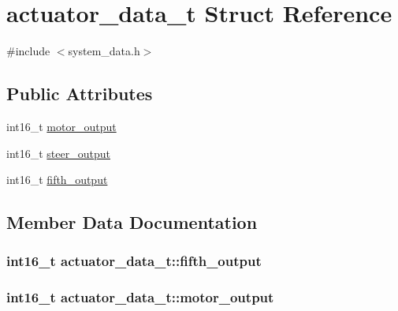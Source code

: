 \hypertarget{structactuator__data__t}{}\section{actuator\+\_\+data\+\_\+t Struct Reference}
\label{structactuator__data__t}


{\ttfamily \#include $<$system\+\_\+data.\+h$>$}

\subsection*{Public Attributes}
\begin{DoxyCompactItemize}
\item 
int16\+\_\+t \hyperlink{structactuator__data__t_a6bb0dbd1bc0cbf0938b3d3b97a180341}{motor\+\_\+output}
\item 
int16\+\_\+t \hyperlink{structactuator__data__t_acf5132436492fb9e558cf10d0b6b645c}{steer\+\_\+output}
\item 
int16\+\_\+t \hyperlink{structactuator__data__t_a596e1fa7fcb12226e6be45007a46a4a2}{fifth\+\_\+output}
\end{DoxyCompactItemize}


\subsection{Member Data Documentation}
\subsubsection[{\texorpdfstring{fifth\+\_\+output}{fifth_output}}]{\setlength{\rightskip}{0pt plus 5cm}int16\+\_\+t actuator\+\_\+data\+\_\+t\+::fifth\+\_\+output}\hypertarget{structactuator__data__t_a596e1fa7fcb12226e6be45007a46a4a2}{}\label{structactuator__data__t_a596e1fa7fcb12226e6be45007a46a4a2}
\subsubsection[{\texorpdfstring{motor\+\_\+output}{motor_output}}]{\setlength{\rightskip}{0pt plus 5cm}int16\+\_\+t actuator\+\_\+data\+\_\+t\+::motor\+\_\+output}\hypertarget{structactuator__data__t_a6bb0dbd1bc0cbf0938b3d3b97a180341}{}\label{structactuator__data__t_a6bb0dbd1bc0cbf0938b3d3b97a180341}
